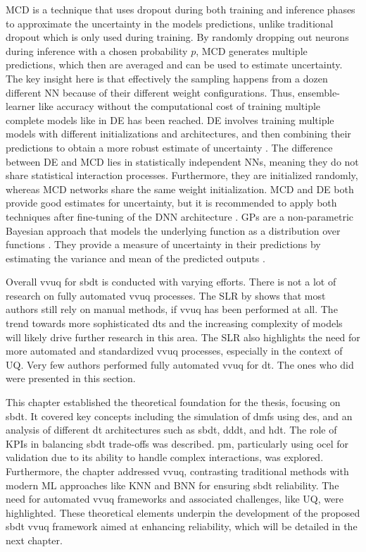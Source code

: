 MCD is a technique that uses dropout \autocite{srivastava2014dropout} during both training and inference phases to approximate the uncertainty in the models predictions, unlike traditional dropout which is only used during training. By randomly dropping out neurons during inference with a chosen probability $p$, MCD generates multiple predictions, which then are averaged and can be used to estimate uncertainty. The key insight here is that effectively the sampling happens from a dozen different NN because of their different weight configurations. Thus, ensemble-learner like accuracy without the computational cost of training multiple complete models like in DE has been reached.
DE involves training multiple models with different initializations and architectures, and then combining their predictions to obtain a more robust estimate of uncertainty \autocite{rahaman2021uncertainty}. The difference between DE and MCD lies in statistically independent NNs, meaning they do not share statistical interaction processes. Furthermore, they are initialized randomly, whereas MCD networks share the same weight initialization. MCD and DE both provide good estimates for uncertainty, but it is recommended to apply both techniques after fine-tuning of the DNN architecture \autocite{kamali2024advancements}.
GPs are a non-parametric Bayesian approach that models the underlying function as a distribution over functions \autocite{bilionis2012multi}. They provide a measure of uncertainty in their predictions by estimating the variance and mean of the predicted outputs \autocite{Burr2025TEADT}.

Overall \gls{vvuq} for \gls{sbdt} is conducted with varying efforts. There is not a lot of research on fully automated \gls{vvuq} processes. The SLR by \textcite{Bitencourt2023} shows that most authors still rely on manual methods, if \gls{vvuq} has been performed at all. The trend towards more sophisticated \gls{dt}s and the increasing complexity of models will likely drive further research in this area. The SLR also highlights the need for more automated and standardized \gls{vvuq} processes, especially in the context of UQ. Very few authors performed fully automated \gls{vvuq} for \gls{dt}. The ones who did were presented in this section.

This chapter established the theoretical foundation for the thesis, focusing on \gls{sbdt}. It covered key concepts including the simulation of \gls{dmfs} using \gls{des}, and an analysis of different \gls{dt} architectures such as \gls{sbdt}, \gls{dddt}, and \gls{hdt}. The role of KPIs in balancing \gls{sbdt} trade-offs was described. \gls{pm}, particularly using \gls{ocel} for validation due to its ability to handle complex interactions, was explored. Furthermore, the chapter addressed \gls{vvuq}, contrasting traditional methods with modern ML approaches like KNN and BNN for ensuring \gls{sbdt} reliability. The need for automated \gls{vvuq} frameworks and associated challenges, like UQ, were highlighted. These theoretical elements underpin the development of the proposed \gls{sbdt} \gls{vvuq} framework aimed at enhancing reliability, which will be detailed in the next chapter.




